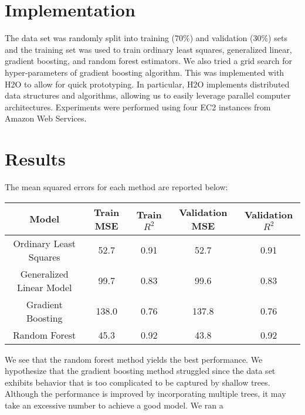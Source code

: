 \documentclass[letterpaper]{article}
\begin{document}
\section{Implementation}
The data set was randomly split into training (70\%) and validation
(30\%) sets and the training set was used to train ordinary least
squares, generalized linear, gradient boosting, and random forest
estimators. We also tried a grid search for hyper-parameters of gradient boosting algorithm. 
This was implemented with H2O to allow for quick
prototyping. In particular, H2O implements distributed data structures
and algorithms, allowing us to easily leverage parallel computer
architectures. Experiments were performed using four EC2 instances
from Amazon Web Services.

\section{Results}
The mean squared errors for each method are reported below:
\begin{table}[H]
  \centering
  \begin{tabular}{c|cccc}
    Model & Train MSE & Train \(R^2\) & Validation MSE & Validation \(R^2\) \\ \hline
    Ordinary Least Squares & 52.7 & 0.91 & 52.7 & 0.91 \\
    Generalized Linear Model & 99.7 & 0.83 & 99.6 & 0.83\\
    Gradient Boosting & 138.0 & 0.76 & 137.8 & 0.76 \\
    Random Forest & 45.3 & 0.92 & 43.8 & 0.92
  \end{tabular}
\end{table}
\noindent
We see that the random forest method yields the best performance. We
hypothesize that the gradient boosting method struggled since the data
set exhibits behavior that is too complicated to be captured by
shallow trees. Although the performance is improved by incorporating
multiple trees, it may take an excessive number to achieve a good
model. We ran a 
\end{document}
